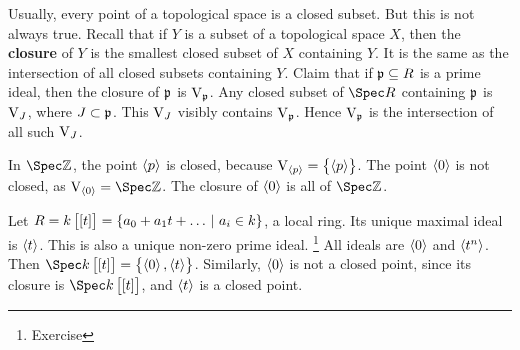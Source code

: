Usually, every point of a topological space is a closed subset. But this is not always true. Recall that if $ Y $ is a subset of a topological space $ X $, then the \textbf{closure} of $ Y $ is the smallest closed subset of $ X $ containing $ Y $. It is the same as the intersection of all closed subsets containing $ Y $. Claim that if $ \mathfrak{p} \subseteq R $ is a prime ideal, then the closure of $ \mathfrak{p} $ is $ \mathrm{V}_{\mathfrak{p}} $. Any closed subset of $ \Spec R $ containing $ \mathfrak{p} $ is $ \mathrm{V}_J $, where $ J \subset \mathfrak{p} $. This $ \mathrm{V}_J $ visibly contains $ \mathrm{V}_{\mathfrak{p}} $. Hence $ \mathrm{V}_{\mathfrak{p}} $ is the intersection of all such $ \mathrm{V}_J $.

\begin{example*}
In $ \Spec \ZZ $, the point $ \left\langle p \right\rangle $ is closed, because $ \V_{\abr{p}} = \cbr{\abr{p}} $. The point $ \left\langle 0 \right\rangle $ is not closed, as $ \V_{\abr{0}} = \Spec \ZZ $. The closure of $ \left\langle 0 \right\rangle $ is all of $ \Spec \ZZ $.
\end{example*}

\begin{example*}
Let $ R = k\sbr{\sbr{t}} = \cbr{a_0 + a_1t + \dots \st a_i \in k} $, a local ring. Its unique maximal ideal is $ \left\langle t \right\rangle $. This is also a unique non-zero prime ideal. \footnote{Exercise} All ideals are $ \left\langle 0 \right\rangle $ and $ \left\langle t^n \right\rangle $. Then $ \Spec k\sbr{\sbr{t}} = \cbr{\abr{0}, \abr{t}} $. Similarly, $ \left\langle 0 \right\rangle $ is not a closed point, since its closure is $ \Spec k\sbr{\sbr{t}} $, and $ \left\langle t \right\rangle $ is a closed point.
\end{example*}


